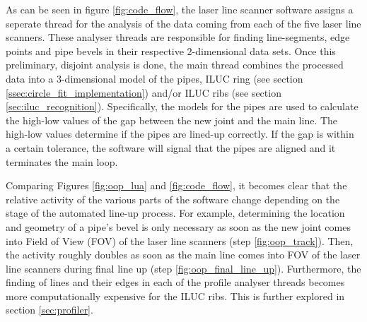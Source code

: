 As can be seen in figure \ref{fig:code_flow}, the laser line scanner software assigns a seperate thread for the analysis of the data coming from each of the five laser line scanners. These analyser threads are responsible for finding line-segments, edge points and pipe bevels in their respective 2-dimensional data sets. Once this preliminary, disjoint analysis is done, the main thread combines the processed data into a 3-dimensional model of the pipes, ILUC ring (see section \ref{ssec:circle_fit_implementation}) and/or ILUC ribs (see section \ref{sec:iluc_recognition}). Specifically, the models for the pipes are used to calculate the high-low values of the gap between the new joint and the main line. The high-low values determine if the pipes are lined-up correctly. If the gap is within a certain tolerance, the software will signal that the pipes are aligned and it terminates the main loop.

Comparing Figures \ref{fig:oop_lua} and \ref{fig:code_flow}, it becomes clear that the relative activity of the various parts of the software change
depending on the stage of the automated line-up process. For example, determining the location and geometry of a pipe's bevel is only necessary as soon as
the new joint comes into Field of View (FOV) of the laser line scanners (step \ref{fig:oop_track}). Then, the activity roughly doubles as soon as the main line
comes into FOV of the laser line scanners during final line up (step \ref{fig:oop_final_line_up}). Furthermore, the finding of lines and their edges in each of the profile analyser threads becomes more computationally expensive for the ILUC ribs. This is further explored in section \ref{sec:profiler}.